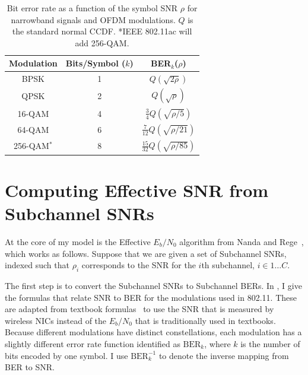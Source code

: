 \begin{table}
\centering
\begin{tabular}{ccc}
\toprule
Modulation & Bits/Symbol ($k$) & BER$_k$($\rho$) \\
\midrule BPSK & 1 & $Q\left(\sqrt{2\rho}\right)$ \\
QPSK & 2 & $Q\left(\sqrt{\rho}\right)$\\
16-QAM & 4 & $\frac{3}{4}Q\left(\sqrt{\rho/5}\right)$\\
64-QAM & 6 & $\frac{7}{12}Q\left(\sqrt{\rho/21}\right)$\\
256-QAM$^*$ & 8 & $\frac{15}{32}Q\left(\sqrt{\rho/85}\right)$\\
\bottomrule
\end{tabular}
\caption[Bit error rate as a function of the symbol SNR for OFDM modulations]{\label{tab:ber_snr}Bit error rate as a function of the symbol SNR $\rho$ for narrowband signals and OFDM modulations. $Q$ is the standard normal CCDF. *IEEE 802.11ac will add 256-QAM.}
\end{table}

\section{Computing Effective SNR from Subchannel SNRs}
At the core of my model is the Effective $E_b/N_0$ algorithm from Nanda and Rege~\cite{Nanda_EffectiveSNR}, which works as follows. Suppose that we are given a set of Subchannel SNRs, indexed such that $\rho_i$ corresponds to the SNR for the $i$th subchannel, $i\in1\dots C$.

The first step is to convert the Subchannel SNRs to Subchannel BERs. In , I give the formulas that relate SNR to BER for the modulations used in 802.11. These are adapted from textbook formulas~\cite[\S3.7.1 and \S7.9.3.1]{Sklar} to use the SNR that is measured by wireless NICs instead of the $E_b/N_0$ that is traditionally used in textbooks. Because different modulations have distinct constellations, each modulation has a slightly different error rate function identified as $\text{BER}_k$, where $k$ is the number of bits encoded by one symbol. I use $\text{BER}_k^{-1}$ to denote the inverse mapping from BER to SNR.

